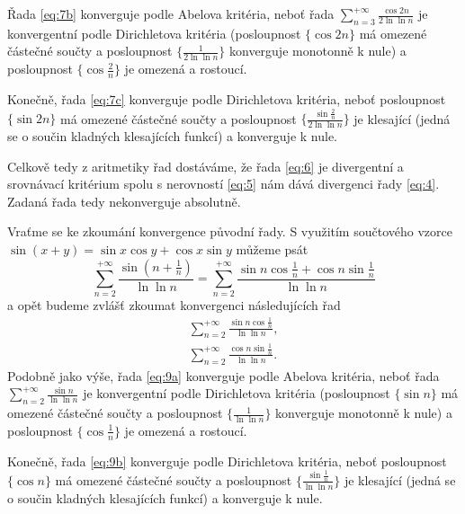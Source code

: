 \documentclass[answers]{exam}
\begin{document}
\begin{questions}
\begin{solution}
  	Řada \eqref{eq:7b} konverguje podle Abelova kritéria, neboť řada $\sum_{n = 3}^{+\infty} \frac{\cos 2n}{2 \ln \ln n}$ je konvergentní podle Dirichletova kritéria (posloupnost $\{ \cos 2n \}$ má omezené částečné součty a posloupnost $\{ \frac{1}{2 \ln \ln n} \}$ konverguje monotonně k nule) a posloupnost $\{ \cos \frac{2}{n} \}$ je omezená a rostoucí. 
  	
  	Konečně, řada \eqref{eq:7c} konverguje podle Dirichletova kritéria, neboť posloupnost $\{ \sin 2n \}$ má omezené částečné součty a posloupnost $\{ \frac{\sin \frac{2}{n}}{2 \ln \ln n} \}$ je klesající (jedná se o součin kladných klesajících funkcí) a konverguje k nule.
  	
  	Celkově tedy z aritmetiky řad dostáváme, že řada \eqref{eq:6} je divergentní a srovnávací kritérium spolu s nerovností \eqref{eq:5} nám dává divergenci řady \eqref{eq:4}. Zadaná řada tedy nekonverguje absolutně.
  	  	
		Vraťme se ke zkoumání konvergence původní řady. S využitím součtového vzorce $\sin (x + y) = \sin x \cos y + \cos x \sin y$ můžeme psát
		\begin{equation}
			\label{eq:8}
	    \sum_{n = 2}^{+\infty}
			\frac{\sin \left( n + \frac{1}{n} \right)}{\ln \ln n}
			=
	   \sum_{n = 2}^{+\infty}
		 \frac{\sin n \cos \frac{1}{n} + \cos n \sin \frac{1}{n}}{\ln \ln n}
		\end{equation}
		a opět budeme zvlášť zkoumat konvergenci následujících řad
  	\begin{subequations}
  		\begin{gather}
  		\label{eq:9a}
  		\sum_{n = 2}^{+\infty}
  		\frac{\sin n \cos \frac{1}{n}}{\ln \ln n},
  		\\
  		\label{eq:9b}
  		\sum_{n = 2}^{+\infty}
  		\frac{\cos n \sin \frac{1}{n}}{\ln \ln n}.
  		\end{gather}
  	\end{subequations}
  	Podobně jako výše, řada \eqref{eq:9a} konverguje podle Abelova kritéria, neboť řada $\sum_{n = 2}^{+\infty} \frac{\sin n}{\ln \ln n}$ je konvergentní podle Dirichletova kritéria (posloupnost $\{ \sin n \}$ má omezené částečné součty a posloupnost $\{ \frac{1}{\ln \ln n} \}$ konverguje monotonně k nule) a posloupnost $\{ \cos \frac{1}{n} \}$ je omezená a rostoucí. 
  	
  	Konečně, řada \eqref{eq:9b} konverguje podle Dirichletova kritéria, neboť posloupnost $\{ \cos n \}$ má omezené částečné součty a posloupnost $\{ \frac{\sin \frac{1}{n}}{\ln \ln n} \}$ je klesající (jedná se o součin kladných klesajících funkcí) a konverguje k nule.
  	

\end{solution}
\end{questions}
\end{document}
